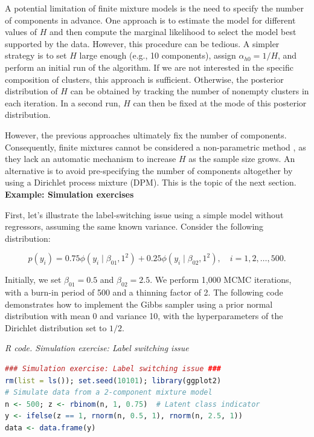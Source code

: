 A potential limitation of finite mixture models is the need to specify the number of components in advance. One approach is to estimate the model for different values of $H$ and then compute the marginal likelihood to select the model best supported by the data. However, this procedure can be tedious. A simpler strategy is to set $H$ large enough (e.g., 10 components), assign $\alpha_{h0} = 1/H$, and perform an initial run of the algorithm. If we are not interested in the specific composition of clusters, this approach is sufficient. Otherwise, the posterior distribution of $H$ can be obtained by tracking the number of nonempty clusters in each iteration. In a second run, $H$ can then be fixed at the mode of this posterior distribution. 

However, the previous approaches ultimately fix the number of components. Consequently, finite mixtures cannot be considered a non-parametric method \cite{rossi2014bayesian}, as they lack an automatic mechanism to increase \( H \) as the sample size grows. An alternative is to avoid pre-specifying the number of components altogether by using a Dirichlet process mixture (DPM). This is the topic of the next section.\\

\textbf{Example: Simulation exercises}

First, let’s illustrate the label-switching issue using a simple model without regressors, assuming the same known variance. Consider the following distribution:  

$$p(y_i) = 0.75 \phi(y_i \mid \beta_{01},1^2) + 0.25 \phi(y_i \mid \beta_{02},1^2), \quad i = 1,2,\dots,500.$$

Initially, we set $\beta_{01} = 0.5$ and $\beta_{02} = 2.5$. We perform 1,000 MCMC iterations, with a burn-in period of 500 and a thinning factor of 2. The following code demonstrates how to implement the Gibbs sampler using a prior normal distribution with mean 0 and variance 10, with the hyperparameters of the Dirichlet distribution set to $1/2$.

\begin{tcolorbox}[enhanced,width=4.67in,center upper,
	fontupper=\large\bfseries,drop shadow southwest,sharp corners]
	\textit{R code. Simulation exercise: Label switching issue}
	\begin{VF}
		\begin{lstlisting}[language=R]
### Simulation exercise: Label switching issue ###
rm(list = ls()); set.seed(10101); library(ggplot2)
# Simulate data from a 2-component mixture model
n <- 500; z <- rbinom(n, 1, 0.75)  # Latent class indicator
y <- ifelse(z == 1, rnorm(n, 0.5, 1), rnorm(n, 2.5, 1))
data <- data.frame(y)
\end{lstlisting}
	\end{VF}
\end{tcolorbox}
 
